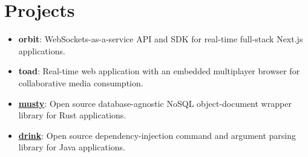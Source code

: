 \documentclass[letterpaper,11pt]{article}
\newcommand{\resumeItem}[2]{
  \item\small{
    \textbf{#1}{: #2 \vspace{-2pt}}
  }
}
\newcommand{\resumeSubItem}[2]{\resumeItem{#1}{#2}\vspace{-4pt}}
\newcommand{\resumeSubHeadingListStart}{\begin{itemize}[leftmargin=*]}
\newcommand{\resumeSubHeadingListEnd}{\end{itemize}}
\begin{document}
\section{Projects}
  \resumeSubHeadingListStart
    \resumeSubItem{orbit}
      {WebSockets-as-a-service API and SDK for real-time full-stack Next.js applications.}
    \resumeSubItem{toad}
      {Real-time web application with an embedded multiplayer browser for collaborative media consumption.}
    \resumeSubItem{\href{https://github.com/tsanga/musty}{musty}}
      {Open source database-agnostic NoSQL object-document wrapper library for Rust applications.}
    \resumeSubItem{\href{https://github.com/jonahseguin/drink}{drink}}
      {Open source dependency-injection command and argument parsing library for Java applications.}
  \resumeSubHeadingListEnd


\end{document}
